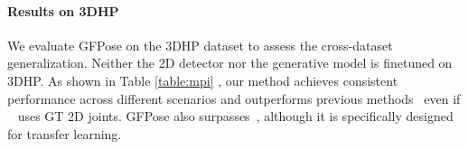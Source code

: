 \documentclass[10pt,twocolumn,letterpaper]{article}
\begin{document}
\vspace{-1.25em}
\paragraph{Results on 3DHP}
We evaluate GFPose on the 3DHP dataset to assess the cross-dataset generalization. Neither the 2D detector nor the generative model is finetuned on 3DHP. As shown in Table \ref{table:mpi} , our method achieves consistent performance across different scenarios and outperforms previous methods~\cite{wehrbein2021probabilistic,Li_2019_CVPR} even if ~\cite{Li_2019_CVPR} uses GT 2D joints. GFPose also surpasses~\cite{li2020weakly}, although it is specifically designed for transfer learning. 

\begin{table}
    \vspace{-0.2cm}
    \caption{Pose estimation results on the 3DHP dataset. 200 samples are drawn. ``GS" represents the ``Green Screen" scene. Our method outperforms~\cite{Li_2019_CVPR, wehrbein2021probabilistic, li2020weakly}, although~\cite{li2020weakly} is specifically designed for domain transfer.}
    \label{table:mpi}
    \vspace{-0.5em}
\end{table}
\end{document}
